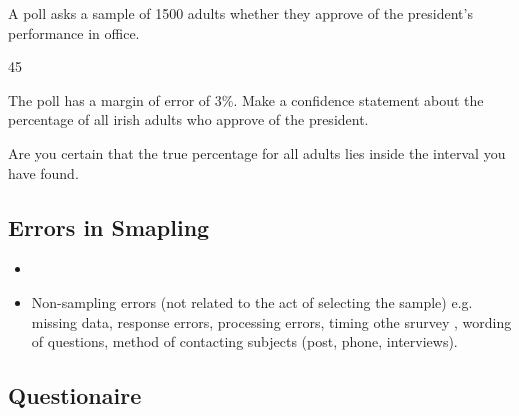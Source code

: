 A poll asks a sample of 1500 adults whether they approve of the president's performance in office.

45%

The poll has a margin of error of 3\%. Make a confidence statement about the percentage of all irish adults who approve of the president.

Are you certain that the true percentage for all adults lies inside the interval you have found.


\subsection*{Errors in Smapling}

\begin{itemize}
\item

\item Non-sampling errors (not related to the act of selecting the sample) e.g. missing data, response errors, processing errors, timing othe srurvey
, wording of questions, method of contacting subjects (post, phone, interviews).

\end{itemize}


\subsection*{Questionaire}


